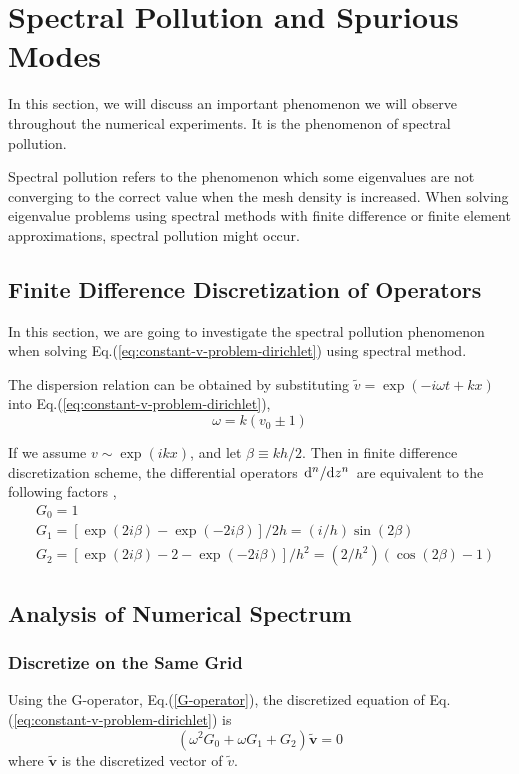 \section{Spectral Pollution and Spurious Modes}
In this section, we will discuss an important phenomenon we will observe throughout the numerical experiments. It is the phenomenon of spectral pollution.

Spectral pollution refers to the phenomenon which some eigenvalues are not converging to the correct value when the mesh density is increased. When solving eigenvalue problems using spectral methods with finite difference or finite element approximations, spectral pollution might occur. \cite{llobet_spectral_1990}

\subsection{Finite Difference Discretization of Operators}
In this section, we are going to investigate the spectral pollution phenomenon when solving Eq.(\ref{eq:constant-v-problem-dirichlet}) using spectral method.

The dispersion relation can be obtained by substituting $\tilde{v} = \exp(-i\omega t + kx)$ into Eq.(\ref{eq:constant-v-problem-dirichlet}),
\begin{equation} \label{dispersion-relation}
	\omega = k(v_0 \pm 1) 
\end{equation}

If we assume $v\sim \exp(ikx)$, and let $\beta\equiv kh/2$. Then in finite difference discretization scheme, the differential operators $\dv*[n]{z}$ are equivalent to the following factors \cite{llobet_spectral_1990},
\begin{align}
	&G_0 = 1 \nonumber \\
	&G_1 = [\exp(2i\beta)-\exp(-2i\beta)]/2h = (i/h)\sin(2\beta) 
	\label{G-operator}\\
	&G_2 = [\exp(2i\beta)-2-\exp(-2i\beta)]/h^2 = (2/h^2)(\cos(2\beta)-1) \nonumber 
\end{align}


\subsection{Analysis of Numerical Spectrum}
\subsubsection{Discretize on the Same Grid}
Using the G-operator, Eq.(\ref{G-operator}), the discretized equation of Eq.(\ref{eq:constant-v-problem-dirichlet}) is 
\begin{equation} \label{eq:discretized-eq-G}
    (\omega^2G_0 + \omega G_1 + G_2)\mathbf{\tilde{v}} = 0
\end{equation}
where $\mathbf{\tilde{v}}$ is the discretized vector of $\tilde{v}$.

